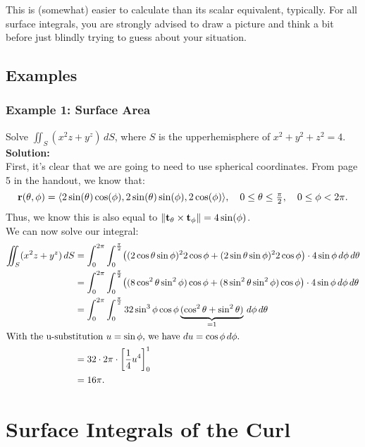 This is (somewhat) easier to calculate than its scalar equivalent, typically. For all surface integrals, you are strongly advised to draw a picture and think a bit before just blindly trying to guess about your situation.

\subsection{Examples}

\subsubsection{Example 1: Surface Area}
Solve \(\iint_{S}(x^{2}z + y^{z}) \, dS\), where \(S\) is the upperhemisphere of \(x^{2} + y^{2} +z^{2} = 4\). \\

\textbf{Solution:} \\
First, it's clear that we are going to need to use spherical coordinates. From page 5 in the handout, we know that:
\[
    \mathbf{r}(\theta,\phi) = \langle 2\sin(\theta)\cos(\phi), 2\sin(\theta)\sin(\phi), 2\cos(\phi) \rangle, \quad 0 \leq \theta \leq \tfrac{\pi}{2}, \quad 0 \leq \phi < 2\pi.
\]
Thus, we know this is also equal to \(\| \mathbf{t}_{\theta} \times \mathbf{t}_{\phi} \| = 4\sin(\phi)\). \\

We can now solve our integral:
\begin{align*}
    \iint_{S} (x^{2}z + y^{z}) \, dS &= \int_{0}^{2\pi} \int_{0}^{\frac{\pi}{2}} \bigl((2\cos\theta \sin\phi)^{2}2\cos\phi + (2\sin\theta\sin\phi)^{2}2\cos\phi\bigr) \cdot 4\sin\phi \, d\phi \, d\theta \\
    &= \int_{0}^{2\pi} \int_{0}^{\frac{\pi}{2}} \bigl((8\cos^{2}\theta\sin^{2}\phi)\cos\phi + (8\sin^{2}\theta\sin^{2}\phi)\cos\phi\bigr) \cdot 4 \sin\phi \, d\phi \, d\theta \\
    &= \int_{0}^{2\pi} \int_{0}^{\frac{\pi}{2}} 32\sin^{3}\phi\cos\phi\underbrace{(\cos^{2}\theta + \sin^{2}\theta)}_{= 1} \, d\phi \, d\theta \\
    \intertext{With the u-substitution \(u = \sin\phi\), we have \(du = \cos\phi \, d\phi\).}
    &= 32 \cdot 2\pi \cdot \left[ \frac{1}{4}u^{4}\right]_{0}^{1} \\
    &= 16\pi.
\end{align*}

\newpage

\section{Surface Integrals of the Curl}

